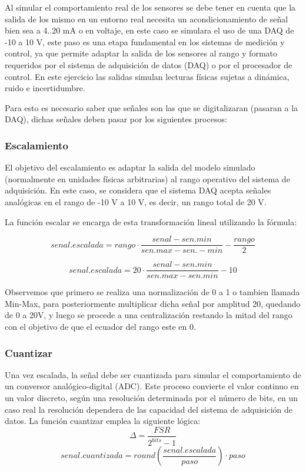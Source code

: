 \documentclass[conference]{IEEEtran}
\begin{document}
Al simular el comportamiento real de los sensores se debe tener en cuenta que la salida de los mismo en un entorno real necesita un acondicionamiento de señal bien sea a 4..20 mA o
en voltaje, en este caso se simulara el uso de una DAQ de -10 a 10 V, este paso es una etapa fundamental en los sistemas de medición y control, ya que permite adaptar la salida de los sensores al
rango y formato requeridos por el sistema de adquisición de datos (DAQ) o por el procesador de control. En este ejercicio las salidas simulan lecturas físicas sujetas a dinámica, ruido e incertidumbre.

Para esto es necesario saber que señales son las que se digitalizaran (pasaran a la DAQ), dichas señales deben pasar por los siguientes procesos:

\subsubsection{Escalamiento}


El objetivo del escalamiento es adaptar la salida del modelo simulado (normalmente en unidades físicas arbitrarias) al rango operativo del sistema de adquisición. En este caso, se considera que el sistema DAQ acepta señales analógicas en el rango de 
-10 V a 10 V, es decir, un rango total de 20 V.

La función escalar se encarga de esta transformación lineal utilizando la fórmula:



\[
senal.escalada = rango \cdot \frac{senal-sen.min}{sen.max-sen.-min} - \frac{rango}{2}
\]

\[
senal.escalada = 20 \cdot \frac{senal-sen.min}{sen.max-sen.min} - 10
\]

Observemos que primero se realiza una normalización de 0 a 1 o tambien llamada Min-Max, para posteriormente multiplicar dicha señal por amplitud 20, quedando de 0 a 20V, y luego se procede a una centralización restando la mitad del rango con el objetivo de que el ecuador del rango este en 0.

\subsubsection{Cuantizar}

Una vez escalada, la señal debe ser cuantizada para simular el comportamiento de un conversor analógico-digital (ADC). Este proceso convierte el valor continuo en un valor discreto, según una resolución determinada por el
número de bits, en un caso real la resolución dependera de las capacidad del sistema de adquisición de datos. La función cuantizar emplea la siguiente lógica:
\[
\Delta = \frac{FSR}{2^{bits} - 1}
\]
\[
senal.cuantizada = round(\frac{senal.escalada}{paso})\cdot paso
\]
\end{document}
